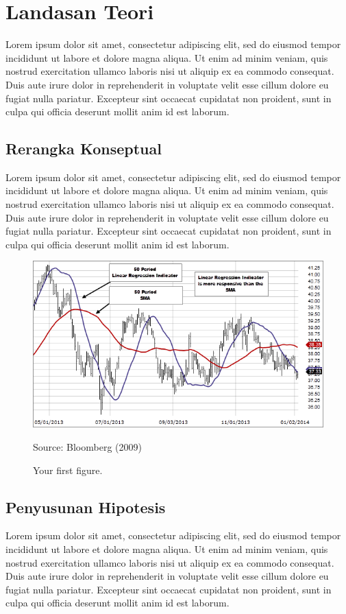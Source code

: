 \documentclass[12pt,hidelinks]{report}
\begin{document}
\chapter{Landasan Teori}
    Lorem ipsum dolor sit amet, consectetur adipiscing elit, sed do eiusmod tempor incididunt ut labore et dolore magna aliqua. Ut enim ad minim veniam, quis nostrud exercitation ullamco laboris nisi ut aliquip ex ea commodo consequat. Duis aute irure dolor in reprehenderit in voluptate velit esse cillum dolore eu fugiat nulla pariatur. Excepteur sint occaecat cupidatat non proident, sunt in culpa qui officia deserunt mollit anim id est laborum.

\section{Rerangka Konseptual}
    Lorem ipsum dolor sit amet, consectetur adipiscing elit, sed do eiusmod tempor incididunt ut labore et dolore magna aliqua. Ut enim ad minim veniam, quis nostrud exercitation ullamco laboris nisi ut aliquip ex ea commodo consequat. Duis aute irure dolor in reprehenderit in voluptate velit esse cillum dolore eu fugiat nulla pariatur. Excepteur sint occaecat cupidatat non proident, sunt in culpa qui officia deserunt mollit anim id est laborum. 

\begin{figure}[t]
\includegraphics[width=\textwidth]{average.png}
    \caption{Your first figure.}
Source: Bloomberg (2009)
    \label{tab:fig1}
\centering
\end{figure}

\section{Penyusunan Hipotesis}
    Lorem ipsum dolor sit amet, consectetur adipiscing elit, sed do eiusmod tempor incididunt ut labore et dolore magna aliqua. Ut enim ad minim veniam, quis nostrud exercitation ullamco laboris nisi ut aliquip ex ea commodo consequat. Duis aute irure dolor in reprehenderit in voluptate velit esse cillum dolore eu fugiat nulla pariatur. Excepteur sint occaecat cupidatat non proident, sunt in culpa qui officia deserunt mollit anim id est laborum.
\end{document}
